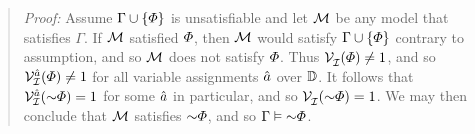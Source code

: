 \label{box:Lemma4}

\begin{quote} 
  \textit{Proof:} Assume $\Gamma \cup \lbrace\varPhi\rbrace$ is unsatisfiable and let $\mathcal{M}$ be any model that satisfies $\Gamma$. 
  If $\mathcal{M}$ satisfied $\varPhi$, then $\mathcal{M}$ would satisfy $\Gamma \cup \lbrace\varPhi\rbrace$ contrary to assumption, and so $\mathcal{M}$ does not satisfy $\varPhi$.
  Thus $\mathcal{V}_{\mathcal{I}}^{}(\varPhi)\neq 1$, and so $\mathcal{V}_{\mathcal{I}}^{\hat{a}}(\varPhi)\neq 1$ for all variable assignments $\hat{a}$ over $\mathbb{D}$.
  It follows that $\VV{\I}{\va{a}}(\enot\metaA)= 1$ for some $\hat{a}$ in particular, and so $\VV{\I}{}(\enot\metaA)= 1$.
  We may then conclude that $\mathcal{M}$ satisfies $\enot\metaA$, and so $\Gamma \models \enot\metaA$.
\end{quote}





\label{box:Lemma5} %

